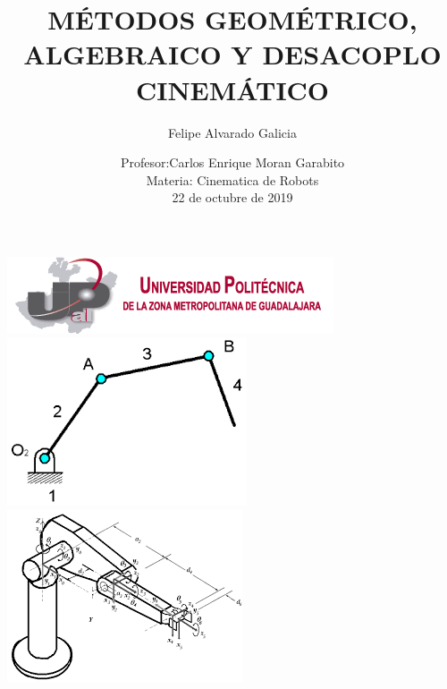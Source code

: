 \documentclass[12pt,a4paper]{article}
\author{Felipe Alvarado Galicia}
\title{MÉTODOS GEOMÉTRICO, ALGEBRAICO Y DESACOPLO CINEMÁTICO}
\date{Profesor:Carlos Enrique Moran Garabito\\
Materia: Cinematica de Robots\\
22 de octubre de 2019}
\begin{document}
\maketitle
 \includegraphics[scale=1]{logo1.png}\\
\includegraphics[scale=1]{imag5.png} 
\includegraphics[scale=1]{imag8.png}\\\\\\\\\\\\\\\\\\\\\\\\\\\\\\\\\\\\\\\\\\\\\\
\end{document}
